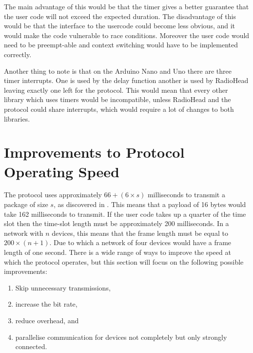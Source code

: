 The main advantage of this would be that the timer gives a better guarantee that the user code will not exceed the expected duration.
The disadvantage of this would be that the interface to the usercode could become less obvious, and it would make the code vulnerable to race conditions.
Moreover the user code would need to be preempt-able and context switching would have to be implemented correctly.

Another thing to note is that on the Arduino Nano and Uno there are three timer interrupts.
One is used by the delay function another is used by RadioHead leaving exactly one left for the protocol.
This would mean that every other library which uses timers would be incompatible, unless RadioHead and the protocol could share interrupts, which would require a lot of changes to both libraries.

\section{Improvements to Protocol Operating Speed}

The protocol uses approximately $66 + (6 \times s)$ milliseconds to transmit a package of size $s$, as discovered in . 
This means that a payload of 16 bytes would take 162 milliseconds to transmit.
If the user code takes up a quarter of the time slot then the time-slot length must be approximately 200 milliseconds.
In a network with $n$ devices, this means that the frame length must be equal to $200 \times (n + 1)$.
Due to which a network of four devices would have a frame length of one second.
There is a wide range of ways to improve the speed at which the protocol operates, but this section will focus on the following possible improvements:
\begin{enumerate}[label=\itshape \alph*\upshape)]
    \item Skip unnecessary transmissions,
    \item increase the bit rate, 
    \item reduce overhead, and
    \item parallelise communication for devices not completely but only strongly connected.
\end{enumerate} 


